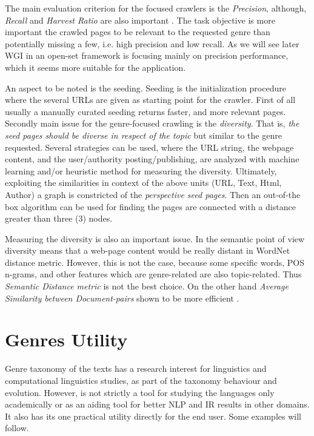  The main evaluation criterion for the focused crawlers is the \textit{Precision}, although, \textit{Recall} and \textit{Harvest Ratio} are also important \parencite{priyatam2013don_URL}. The task objective is more important the crawled pages to be relevant to the requested genre than potentially missing a few, i.e. high precision and low recall. As we will see later WGI in an open-set framework is focusing mainly on precision performance, which it seems more suitable for the application. 
 
An aspect to be noted is the seeding. Seeding is the initialization procedure where the several URLs are given as starting point for the crawler. First of all usually a manually curated seeding returns faster, and more relevant pages. Secondly main issue for the genre-focused crawling is the \textit{diversity}. That is, \textit{the seed pages should be diverse in respect of the topic} but similar to the genre requested. Several strategies can be used, where the URL string, the webpage content, and the user/authority posting/publishing, are analyzed with machine learning and/or heuristic method for measuring the diversity. Ultimately, exploiting the similarities in context of the above units (URL, Text, Html, Author) a graph is constricted of the \textit{perspective seed pages}. Then an out-of-the box algorithm can be used for finding the pages are connected with a distance greater than three (3) nodes.
 
Measuring the diversity is also an important issue. In the semantic point of view diversity means that a web-page content would be really distant in WordNet distance metric. However, this is not the case, because some specific words, POS n-grams, and other features which are genre-related are also topic-related. Thus \textit{Semantic Distance metric } is not the best choice. On the other hand \textit{Average Similarity between Document-pairs} shown to be more efficient \parencite{priyatam2013don_URL}. 
 
    

\section{Genres Utility}\label{chap:relevant_work:sec:intro}

Genre taxonomy of the texts has a research interest for linguistics and computational linguistics studies, as part of the taxonomy behaviour and evolution. However, is not strictly a tool for studying the languages only academically or as an aiding tool for better NLP and IR results in other domains. It also has its one practical utility directly for the end user. Some examples will follow.

